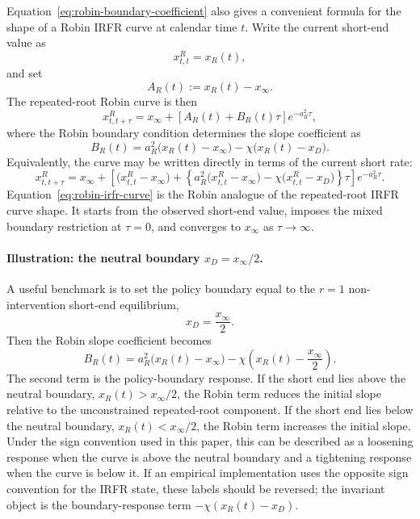 \documentclass[11pt]{article}
\numberwithin{equation}{section}
\begin{document}
Equation~\eqref{eq:robin-boundary-coefficient} also gives a convenient formula for the shape of a Robin IRFR curve at calendar time $t$. Write the current short-end value as
\begin{equation}
x^R_{t,t}=x_R(t),
\end{equation}
and set
\begin{equation}
A_R(t):=x_R(t)-x_\infty.
\end{equation}
The repeated-root Robin curve is then
\begin{equation}
\label{eq:robin-irfr-curve-ab}
x^R_{t,t+\tau}
=
x_\infty+\left[A_R(t)+B_R(t)\tau\right]e^{-a_R^2\tau},
\end{equation}
where the Robin boundary condition determines the slope coefficient as
\begin{equation}
\label{eq:robin-slope-coefficient}
B_R(t)=a_R^2\bigl(x_R(t)-x_\infty\bigr)-\chi\bigl(x_R(t)-x_D\bigr).
\end{equation}
Equivalently, the curve may be written directly in terms of the current short rate:
\begin{equation}
\label{eq:robin-irfr-curve}
x^R_{t,t+\tau}
=
x_\infty+
\left[
\bigl(x^R_{t,t}-x_\infty\bigr)
+
\left\{
a_R^2\bigl(x^R_{t,t}-x_\infty\bigr)-\chi\bigl(x^R_{t,t}-x_D\bigr)
\right\}\tau
\right]
e^{-a_R^2\tau}.
\end{equation}
Equation~\eqref{eq:robin-irfr-curve} is the Robin analogue of the repeated-root IRFR curve shape. It starts from the observed short-end value, imposes the mixed boundary restriction at $\tau=0$, and converges to $x_\infty$ as $\tau\to\infty$.

\paragraph{Illustration: the neutral boundary $x_D=x_\infty/2$.}
A useful benchmark is to set the policy boundary equal to the $r=1$ non-intervention short-end equilibrium,
\begin{equation}
\label{eq:neutral-boundary}
x_D=\frac{x_\infty}{2}.
\end{equation}
Then the Robin slope coefficient becomes
\begin{equation}
\label{eq:robin-slope-neutral-boundary}
B_R(t)=a_R^2\bigl(x_R(t)-x_\infty\bigr)-\chi\left(x_R(t)-\frac{x_\infty}{2}\right).
\end{equation}
The second term is the policy-boundary response. If the short end lies above the neutral boundary, $x_R(t)>x_\infty/2$, the Robin term reduces the initial slope relative to the unconstrained repeated-root component. If the short end lies below the neutral boundary, $x_R(t)<x_\infty/2$, the Robin term increases the initial slope. Under the sign convention used in this paper, this can be described as a loosening response when the curve is above the neutral boundary and a tightening response when the curve is below it. If an empirical implementation uses the opposite sign convention for the IRFR state, these labels should be reversed; the invariant object is the boundary-response term $-\chi(x_R(t)-x_D)$.
\end{document}
